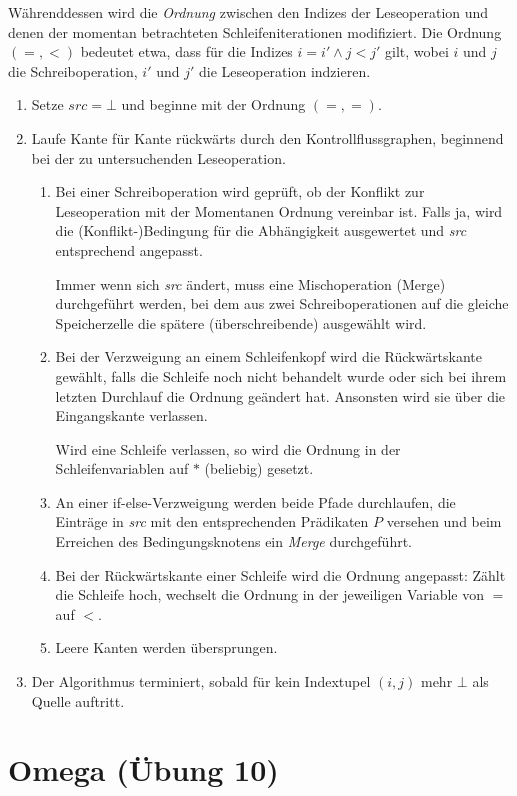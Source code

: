 \documentclass[a4paper,10pt]{article}
\begin{document}
Währenddessen wird die \textit{Ordnung} zwischen den Indizes der Leseoperation und denen der momentan betrachteten Schleifeniterationen modifiziert. Die Ordnung $(=,<)$ bedeutet etwa, dass für die Indizes $i=i'\wedge j<j'$ gilt, wobei $i$ und $j$ die Schreiboperation, $i'$ und $j'$ die Leseoperation indzieren.
\begin{enumerate}
    \item Setze $\mathit{src}={\bot}$ und beginne mit der Ordnung $(=,=)$.
    \item Laufe Kante für Kante rückwärts durch den Kontrollflussgraphen, beginnend bei der zu untersuchenden Leseoperation.
        \begin{enumerate}
            \item Bei einer Schreiboperation wird geprüft, ob der Konflikt zur Leseoperation mit der Momentanen Ordnung vereinbar ist. Falls ja, wird die (Konflikt-)Bedingung für die Abhängigkeit ausgewertet und \textit{src} entsprechend angepasst.

                Immer wenn sich \textit{src} ändert, muss eine Mischoperation (Merge) durchgeführt werden, bei dem aus zwei Schreiboperationen auf die gleiche Speicherzelle die spätere (überschreibende) ausgewählt wird.
            \item Bei der Verzweigung an einem Schleifenkopf wird die Rückwärtskante gewählt, falls die Schleife noch nicht behandelt wurde oder sich bei ihrem letzten Durchlauf die Ordnung geändert hat. Ansonsten wird sie über die Eingangskante verlassen.

                Wird eine Schleife verlassen, so wird die Ordnung in der Schleifenvariablen auf $*$ (beliebig) gesetzt.
            \item An einer if-else-Verzweigung werden beide Pfade durchlaufen, die Einträge in \textit{src} mit
                den entsprechenden Prädikaten $P$ versehen und beim Erreichen des Bedingungsknotens ein \textit{Merge} durchgeführt.
            \item Bei der Rückwärtskante einer Schleife wird die Ordnung angepasst: Zählt die Schleife hoch, wechselt die Ordnung in der jeweiligen Variable von $=$ auf $<$.
            \item Leere Kanten werden übersprungen.
        \end{enumerate}
    \item Der Algorithmus terminiert, sobald für kein Indextupel $(i,j)$ mehr $\bot$ als Quelle auftritt.
\end{enumerate}

\section{Omega (Übung 10)}
\end{document}
